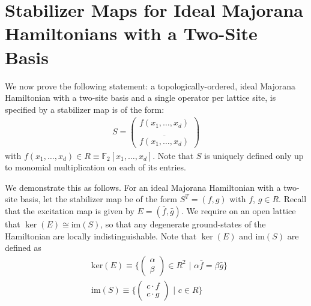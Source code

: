 \documentclass[aps,twocolumn,preprintnumbers,floatfix,showpacs,prx]{revtex4-1}
\begin{document}
\section{Stabilizer Maps for Ideal Majorana Hamiltonians with a Two-Site Basis} 
\label{app:StabilizerMap}

We now prove the following statement: a topologically-ordered, ideal Majorana Hamiltonian with a two-site basis and a single operator per lattice site, is specified by a stabilizer map is of the form:
\begin{align}
S = \left(\begin{array}{c}
 f(x_{1}, \ldots, x_{d})\\ \\
 \overline{f(x_{1},\ldots,x_{d})}
 \end{array}\right)
\end{align}
with $f(x_{1},\ldots,x_{d})\in R \equiv \mathbb{F}_{2}[x_{1},\ldots,x_{d}]$.  Note that $S$ is uniquely defined only up to monomial multiplication on each of its entries. 
 
We demonstrate this as follows. For an ideal Majorana Hamiltonian with a two-site basis,
let the stabilizer map be of the form $S^{T} = (f, g)$ with $f$, $g\in R$.
Recall that the excitation map is given by $E = (\bar{f}, \bar{g})$.
We require on an open lattice that $\ker (E) \cong \mathrm{im}(S)$,
so that any degenerate ground-states of the Hamiltonian are locally indistinguishable.
Note that $\ker(E)$ and $\mathrm{im}(S)$ are defined as 
\begin{align}
&\mathrm{ker}(E) \equiv \Bigg\{\left(\begin{array}{c}\alpha\\ \beta \end{array}\right)\in R^2\,\,\Bigg | \,\,\alpha \bar{f} = \beta \bar{g}\Bigg\}\\
&\mathrm{im}(S) \equiv \Bigg\{\left(\begin{array}{c}c\cdot f\\ c\cdot g \end{array}\right)\,\,\Bigg | \,\,c \in R\Bigg\}
\end{align}
\end{document}
